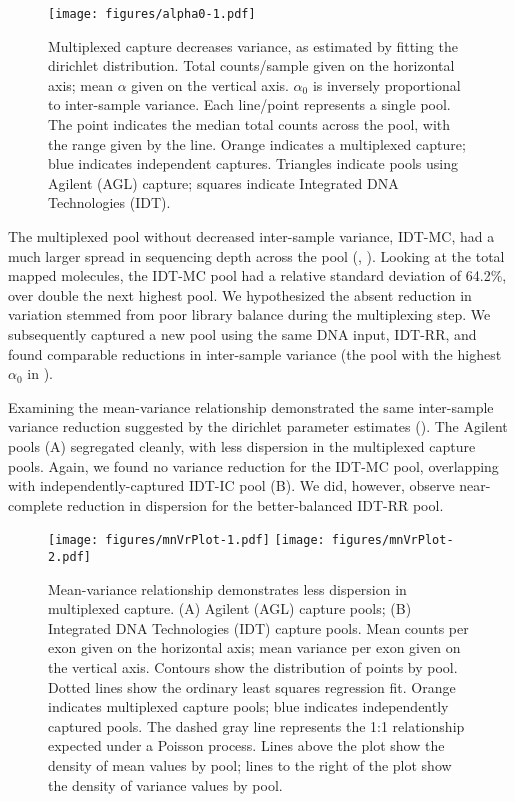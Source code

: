 \documentclass{article}\usepackage[]{graphicx}\usepackage[]{color}
\begin{document}
\begin{figure}
  \centering
  \texttt{[image: figures/alpha0-1.pdf]}
  \caption{Multiplexed capture decreases variance, as estimated by fitting the dirichlet distribution. Total counts/sample given on the horizontal axis; mean $\alpha$ given on the vertical axis. $\alpha_0$ is inversely proportional to inter-sample variance. Each line/point represents a single pool. The point indicates the median total counts across the pool, with the range given by the line. Orange indicates a multiplexed capture; blue indicates independent captures. Triangles indicate pools using Agilent (AGL) capture; squares indicate Integrated DNA Technologies (IDT).}
  \label{fig:alpha0}
\end{figure}

The multiplexed pool without decreased inter-sample variance, IDT-MC, had a much larger spread in sequencing depth across the pool (, ).
Looking at the total mapped molecules, the IDT-MC pool had a relative standard deviation of 64.2\%, over double the next highest pool.
We hypothesized the absent reduction in variation stemmed from poor library balance during the multiplexing step.
We subsequently captured a new pool using the same DNA input, IDT-RR, and found comparable reductions in inter-sample variance (the pool with the highest $\alpha_0$ in ).

Examining the mean-variance relationship demonstrated the same inter-sample variance reduction suggested by the dirichlet parameter estimates ().
The Agilent pools (A) segregated cleanly, with less dispersion in the multiplexed capture pools.
Again, we found no variance reduction for the IDT-MC pool, overlapping with independently-captured IDT-IC pool (B).
We did, however, observe near-complete reduction in dispersion for the better-balanced IDT-RR pool.

\begin{figure}
  \centering
  \texttt{[image: figures/mnVrPlot-1.pdf]}%
  \texttt{[image: figures/mnVrPlot-2.pdf]}
  \caption{Mean-variance relationship demonstrates less dispersion in multiplexed capture. (A) Agilent (AGL) capture pools; (B) Integrated DNA Technologies (IDT) capture pools. Mean counts per exon given on the horizontal axis; mean variance per exon given on the vertical axis. Contours show the distribution of points by pool. Dotted lines show the ordinary least squares regression fit. Orange indicates multiplexed capture pools; blue indicates independently captured pools. The dashed gray line represents the 1:1 relationship expected under a Poisson process. Lines above the plot show the density of mean values by pool; lines to the right of the plot show the density of variance values by pool.}
  \label{fig:mnvr}
\end{figure}
\end{document}
